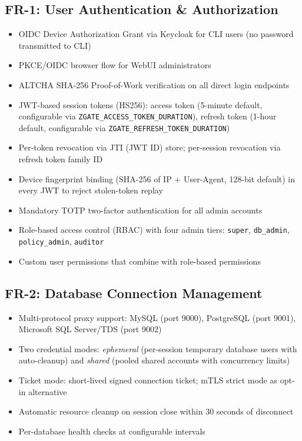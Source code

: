 \subsection{FR-1: User Authentication \& Authorization}
\begin{itemize}
    \item OIDC Device Authorization Grant via Keycloak for CLI users (no password transmitted to CLI)
    \item PKCE/OIDC browser flow for WebUI administrators
    \item ALTCHA SHA-256 Proof-of-Work verification on all direct login endpoints
    \item JWT-based session tokens (HS256): access token (5-minute default, configurable via \texttt{ZGATE\_ACCESS\_TOKEN\_DURATION}), refresh token (1-hour default, configurable via \texttt{ZGATE\_REFRESH\_TOKEN\_DURATION})
    \item Per-token revocation via JTI (JWT ID) store; per-session revocation via refresh token family ID
    \item Device fingerprint binding (SHA-256 of IP + User-Agent, 128-bit default) in every JWT to reject stolen-token replay
    \item Mandatory TOTP two-factor authentication for all admin accounts
    \item Role-based access control (RBAC) with four admin tiers: \texttt{super}, \texttt{db\_admin}, \texttt{policy\_admin}, \texttt{auditor}
    \item Custom user permissions that combine with role-based permissions
\end{itemize}

\subsection{FR-2: Database Connection Management}
\begin{itemize}
    \item Multi-protocol proxy support: MySQL (port 9000), PostgreSQL (port 9001), Microsoft SQL Server/TDS (port 9002)
    \item Two credential modes: \textit{ephemeral} (per-session temporary database users with auto-cleanup) and \textit{shared} (pooled shared accounts with concurrency limits)
    \item Ticket mode: short-lived signed connection ticket; mTLS strict mode as opt-in alternative
    \item Automatic resource cleanup on session close within 30 seconds of disconnect
    \item Per-database health checks at configurable intervals
\end{itemize}

